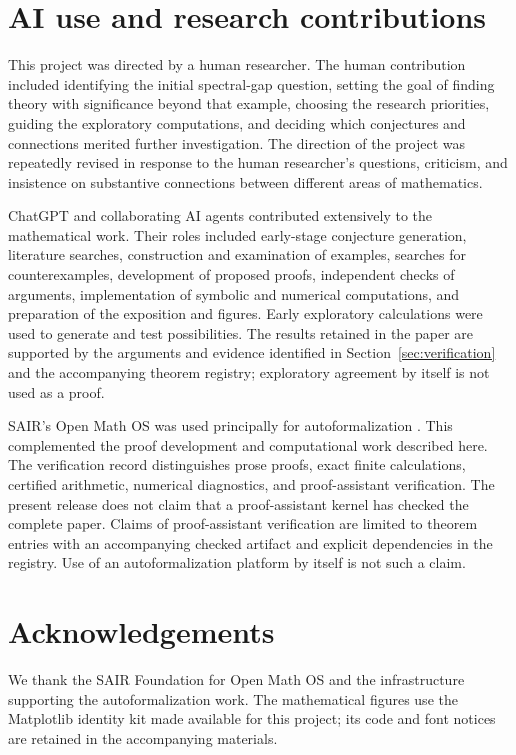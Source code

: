 \section*{AI use and research contributions}

This project was directed by a human researcher. The human contribution
included identifying the initial spectral-gap question, setting the goal
of finding theory with significance beyond that example, choosing the
research priorities, guiding the exploratory computations, and deciding
which conjectures and connections merited further investigation. The
direction of the project was repeatedly revised in response to the
human researcher's questions, criticism, and insistence on substantive
connections between different areas of mathematics.

ChatGPT and collaborating AI agents contributed extensively to the
mathematical work. Their roles included early-stage conjecture generation,
literature searches, construction and examination of examples, searches
for counterexamples, development of proposed proofs, independent checks
of arguments, implementation of symbolic and numerical computations,
and preparation of the exposition and figures. Early exploratory
calculations were used to generate and test possibilities. The results
retained in the paper are supported by the arguments and evidence
identified in Section~\ref{sec:verification} and the accompanying theorem
registry; exploratory agreement by itself is not used as a proof.

SAIR's Open Math OS was used principally for autoformalization
\citep{SAIROpenMathOS2026}. This complemented the proof development and
computational work described here. The verification record distinguishes
prose proofs, exact finite calculations, certified arithmetic, numerical
diagnostics, and proof-assistant verification. The present release does
not claim that a proof-assistant kernel has checked the complete paper.
Claims of proof-assistant verification are limited to theorem entries
with an accompanying checked artifact and explicit dependencies in the
registry. Use of an autoformalization platform by itself is not such a
claim.

\section*{Acknowledgements}

We thank the SAIR Foundation for Open Math OS and the infrastructure
supporting the autoformalization work. The mathematical figures use the
Matplotlib identity kit made available for this project; its code and
font notices are retained in the accompanying materials.
